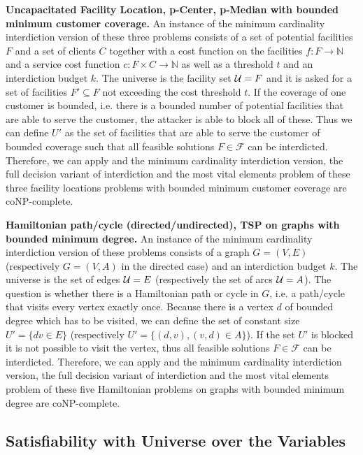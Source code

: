 \textbf{Uncapacitated Facility Location, p-Center, p-Median with bounded minimum customer coverage.}
An instance of the minimum cardinality interdiction version of these three problems consists of a set of potential facilities $F$ and a set of clients $C$ together with a cost function on the facilities $f: F \rightarrow \mathbb N$ and a service cost function $c: F \times C \rightarrow \mathbb N$ as well as a threshold $t$ and an interdiction budget $k$.
The universe is the facility set $\mathcal{U} = F$ and it is asked for a set of facilities $F' \subseteq F$ not exceeding the cost threshold $t$.
If the coverage of one customer is bounded, i.e. there is a bounded number of potential facilities that are able to serve the customer, the attacker is able to block all of these.
Thus we can define $U'$ as the set of facilities that are able to serve the customer of bounded coverage such that all feasible solutions $F \in \mathcal F$ can be interdicted.
Therefore, we can apply  and the minimum cardinality interdiction version, the full decision variant of interdiction and the most vital elements problem of these three facility locations problems with bounded minimum customer coverage are coNP-complete.

\textbf{Hamiltonian path/cycle (directed/undirected), TSP on graphs with bounded minimum degree.}
An instance of the minimum cardinality interdiction version of these problems consists of a graph $G=(V,E)$ (respectively $G=(V,A)$ in the directed case) and an interdiction budget $k$.
The universe is the set of edges $\mathcal{U} = E$ (respectively the set of arcs $\mathcal{U} = A$).
The question is whether there is a Hamiltonian path or cycle in $G$, i.e. a path/cycle that visits every vertex exactly once.
Because there is a vertex $d$ of bounded degree which has to be visited, we can define the set of constant size $U' = \{dv \in E\}$ (respectively $U' = \{(d,v),(v,d) \in A\}$).
If the set $U'$ is blocked it is not possible to visit the vertex, thus all feasible solutions $F \in \mathcal F$ can be interdicted.
Therefore, we can apply  and the minimum cardinality interdiction version, the full decision variant of interdiction and the most vital elements problem of these five Hamiltonian problems on graphs with bounded minimum degree are coNP-complete.

\subsection{Satisfiability with Universe over the Variables}

